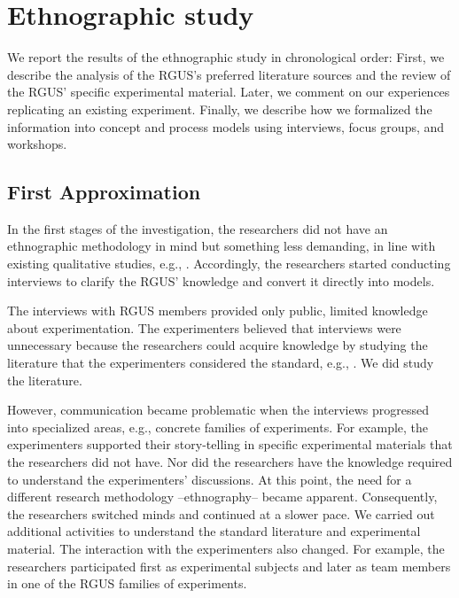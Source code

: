 \section{Ethnographic study}\label{sec-reseach-execution}
We report the results of the ethnographic study in chronological order: First, we describe the analysis of the RGUS's preferred literature sources and the review of the RGUS' specific experimental material. Later, we comment on our experiences replicating an existing experiment. Finally, we describe how we formalized the information into concept and process models using interviews, focus groups, and workshops.

\subsection{First Approximation}
In the first stages of the investigation, the researchers did not have an ethnographic methodology in mind but something less demanding, in line with existing qualitative studies, e.g., \cite{Johanssen-2019-Continuous-SE-support} \cite{Strandberg-2019-Ethical-Interviews-SE} \cite{Yang-2021-interview-study-developers}. Accordingly, the researchers started conducting interviews to clarify the RGUS' knowledge and convert it directly into models. 

The interviews with RGUS members provided only public, limited knowledge about experimentation. The experimenters believed that interviews were unnecessary because the researchers could acquire knowledge by studying the literature that the experimenters considered the standard, e.g., \cite{Wohlin-2000-Experimentation-SE}. We did study the literature.

However, communication became problematic when the interviews progressed into specialized areas, e.g., concrete families of experiments. For example, the experimenters supported their story-telling in specific experimental materials that the researchers did not have. Nor did the researchers have the knowledge required to understand the experimenters' discussions. At this point, the need for a different research methodology --ethnography-- became apparent. Consequently, the researchers switched minds and continued at a slower pace. We carried out additional activities to understand the standard literature and experimental material. The interaction with the experimenters also changed. For example, the researchers participated first as experimental subjects and later as team members in one of the RGUS families of experiments.

